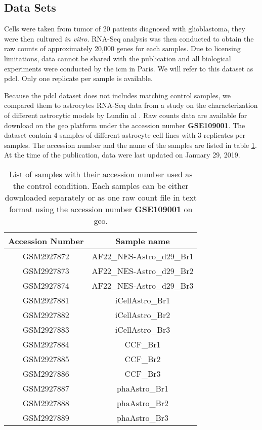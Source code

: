 \subsection{Data Sets}

Cells were taken from tumor of 20 patients diagnosed with glioblastoma, they were  then cultured \textit{in vitro}.
RNA-Seq analysis was then conducted to obtain the raw counts of approximately 20,000 genes for each samples.
Due to licensing limitations, data cannot be shared with the publication and all biological experiments were conducted by the \acrfull{icm} in Paris.
We will refer to this dataset as \acrfull{pdcl}.
Only one replicate per sample is available.

Because the \acrshort{pdcl} dataset does not includes matching control samples, we compared them to astrocytes RNA-Seq data from a study on the characterization of different astrocytic models by Lundin  al \cite*{Lundin2018}.
Raw counts data are available for download on the \acrfull{geo} platform under the accession number \textbf{GSE109001}.
The dataset contain 4 samples of different astrocyte cell lines with 3 replicates per samples.
The accession number and the name of the samples are listed in table \ref*{table:list-control-samples}.
At the time of the publication, data were last updated on January 29, 2019.

\begin{table}
    \centering
    \begin{tabular}{ |c|c| }
        \hline
        Accession Number & Sample name \\
        \hline
        GSM2927872 & AF22\_NES-Astro\_d29\_Br1 \\
        GSM2927873 & AF22\_NES-Astro\_d29\_Br2 \\
        GSM2927874 & AF22\_NES-Astro\_d29\_Br3 \\
        \hline
        GSM2927881 & iCellAstro\_Br1 \\
        GSM2927882 & iCellAstro\_Br2 \\
        GSM2927883 & iCellAstro\_Br3 \\
        \hline
        GSM2927884 & CCF\_Br1 \\
        GSM2927885 & CCF\_Br2 \\
        GSM2927886 & CCF\_Br3 \\
        \hline
        GSM2927887 & phaAstro\_Br1 \\ 
        GSM2927888 & phaAstro\_Br2 \\ 
        GSM2927889 & phaAstro\_Br3 \\ 
        \hline
    \end{tabular}
    \caption{
        List of samples with their accession number used as the control condition.
        Each samples can be either downloaded separately or as one raw count file in text format using the accession number \textbf{GSE109001} on \acrshort{geo}.
    }
    \label{table:list-control-samples}
\end{table}

